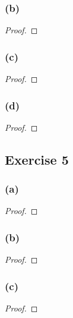\documentclass[14pt]{extarticle}
\begin{document}
\subsubsection{(b)}

\begin{proof}

\end{proof}

\subsubsection{(c)}

\begin{proof}

\end{proof}

\subsubsection{(d)}

\begin{proof}

\end{proof}

\subsection{Exercise 5}

\subsubsection{(a)}

\begin{proof}

\end{proof}

\subsubsection{(b)}

\begin{proof}

\end{proof}

\subsubsection{(c)}

\begin{proof}

\end{proof}
\end{document}
